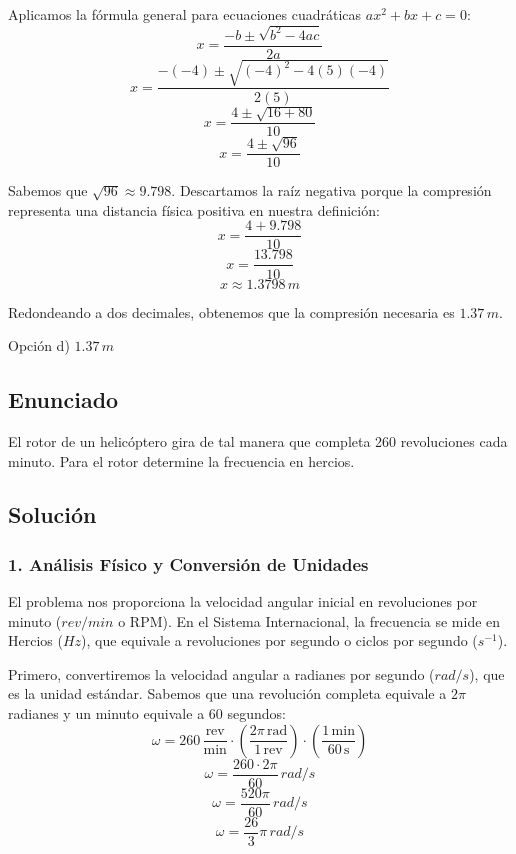 \documentclass[12pt, a4paper]{article}
\begin{document}
Aplicamos la fórmula general para ecuaciones cuadráticas $ax^2 + bx + c = 0$:
$$ x = \frac{-b \pm \sqrt{b^2 - 4ac}}{2a} $$
$$ x = \frac{-(-4) \pm \sqrt{(-4)^2 - 4(5)(-4)}}{2(5)} $$
$$ x = \frac{4 \pm \sqrt{16 + 80}}{10} $$
$$ x = \frac{4 \pm \sqrt{96}}{10} $$

Sabemos que $\sqrt{96} \approx 9.798$. Descartamos la raíz negativa porque la compresión representa una distancia física positiva en nuestra definición:
$$ x = \frac{4 + 9.798}{10} $$
$$ x = \frac{13.798}{10} $$
$$ x \approx 1.3798 \, \si{m} $$

Redondeando a dos decimales, obtenemos que la compresión necesaria es $1.37 \, \si{m}$.

\begin{tcolorbox}[colback=green!5!white, colframe=green!50!black, title=Respuesta Final]
\centering Opción d) $1.37 \, \si{m}$
\end{tcolorbox}

\newpage

\subsection*{Enunciado}
El rotor de un helicóptero gira de tal manera que completa 260 revoluciones cada minuto. Para el rotor determine la frecuencia en hercios.

\subsection*{Solución}

\subsubsection*{1. Análisis Físico y Conversión de Unidades}
El problema nos proporciona la velocidad angular inicial en revoluciones por minuto ($\si{rev/min}$ o RPM). En el Sistema Internacional, la frecuencia se mide en Hercios ($\si{Hz}$), que equivale a revoluciones por segundo o ciclos por segundo ($\si{s^{-1}}$).

Primero, convertiremos la velocidad angular a radianes por segundo ($\si{rad/s}$), que es la unidad estándar. Sabemos que una revolución completa equivale a $2\pi$ radianes y un minuto equivale a $60$ segundos:
$$ \omega = 260 \, \frac{\text{rev}}{\text{min}} \cdot \left( \frac{2\pi \, \text{rad}}{1 \, \text{rev}} \right) \cdot \left( \frac{1 \, \text{min}}{60 \, \text{s}} \right) $$
$$ \omega = \frac{260 \cdot 2\pi}{60} \, \si{rad/s} $$
$$ \omega = \frac{520\pi}{60} \, \si{rad/s} $$
$$ \omega = \frac{26}{3}\pi \, \si{rad/s} $$
\end{document}
